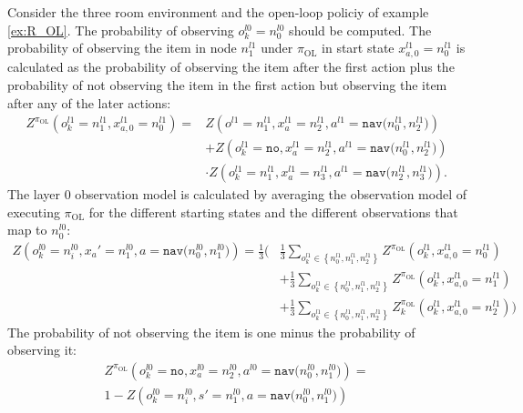 \begin{example}
Consider the three room environment and the open-loop policiy of example \ref{ex:R_OL}. The probability of observing $o_k^{l0}=n_0^{l0}$ should be computed. The probability of observing the item in node $n_1^{l1}$ under $\pi_\text{OL}$ in start state $x_{a,0}^{l1}=n_0^{l1}$ is calculated as the probability of observing the item after the first action plus the probability of not observing the item in the first action but observing the item after any of the later actions:
\begin{equation}
    \begin{aligned}
        Z^{\pi_\text{OL}}\left( o_k^{l1}=n_1^{l1},x_{a,0}^{l1}=n_0^{l1} \right) = &Z\left(o^{l1}=n_1^{l1}, x_a^{l1}=n_2^{l1}, a^{l1}=\texttt{nav($n_0^{l1}, n_2^{l1}$)} \right)\\
        &+ Z\left(o_k^{l1}=\texttt{no}, x_a^{l1}=n_2^{l1}, a^{l1}=\texttt{nav($n_0^{l1}, n_2^{l1}$)} \right)\\
        &\cdot Z\left(o_k^{l1}=n_1^{l1}, x_a^{l1}=n_3^{l1}, a^{l1}=\texttt{nav($n_2^{l1}, n_3^{l1}$)} \right).
    \end{aligned}
\end{equation}
The layer 0 observation model is calculated by averaging the observation model of executing $\pi_\text{OL}$ for the different starting states and the different observations that map to $n_0^{l0}$:
\begin{equation}
    \begin{aligned}
        Z\left(o_k^{l0}=n_i^{l0},x_a'=n_1^{l0}, a=\texttt{nav($n_0^{l0}, n_1^{l0}$)}\right) = \frac{1}{3}\bigg( &\frac{1}{3}\sum_{o_k^{l1}\in\left\{n_0^{l1},n_1^{l1},n_2^{l1}\right\}} Z^{\pi_\text{OL}}\left( o_k^{l1},x_{a,0}^{l1}=n_0^{l1} \right)\\
        &+\frac{1}{3}\sum_{o_k^{l1}\in\left\{n_0^{l1},n_1^{l1},n_2^{l1}\right\}} Z^{\pi_\text{OL}}\left( o_k^{l1},x_{a,0}^{l1}=n_1^{l1} \right)  \\
        & +\frac{1}{3}\sum_{o_k^{l1}\in\left\{n_0^{l1},n_1^{l1},n_2^{l1}\right\}} Z_k^{\pi_\text{OL}}\left( o_k^{l1},x_{a,0}^{l1}=n_2^{l1} \right) \bigg)
    \end{aligned}
\end{equation}
The probability of not observing the item is one minus the probability of observing it:
\begin{multline}
    Z^{\pi_\text{OL}}\left( o_k^{l0}=\texttt{no}, x_a^{l0}=n_2^{l0}, a^{l0}=\texttt{nav($n_0^{l0},n_1^{l0}$)}\right) = \\
    1 - Z\left(o_k^{l0}=n_i^{l0},s'=n_1^{l0}, a=\texttt{nav($n_0^{l0}, n_1^{l0}$)}\right)
\end{multline}
\demo
\end{example}

